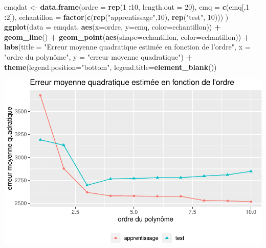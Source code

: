 \documentclass[
]{book}
\newenvironment{Shaded}{\begin{snugshade}}{\end{snugshade}}
\newcommand{\DataTypeTok}[1]{\textcolor[rgb]{0.13,0.29,0.53}{#1}}
\newcommand{\DecValTok}[1]{\textcolor[rgb]{0.00,0.00,0.81}{#1}}
\newcommand{\KeywordTok}[1]{\textcolor[rgb]{0.13,0.29,0.53}{\textbf{#1}}}
\newcommand{\NormalTok}[1]{#1}
\newcommand{\OperatorTok}[1]{\textcolor[rgb]{0.81,0.36,0.00}{\textbf{#1}}}
\newcommand{\StringTok}[1]{\textcolor[rgb]{0.31,0.60,0.02}{#1}}
\theoremstyle{definition}
\theoremstyle{definition}
\theoremstyle{definition}
\theoremstyle{remark}
\begin{document}
\begin{Shaded}
\begin{Highlighting}[]
\NormalTok{emqdat <-}\StringTok{ }\KeywordTok{data.frame}\NormalTok{(}\DataTypeTok{ordre =} \KeywordTok{rep}\NormalTok{(}\DecValTok{1} \OperatorTok{:}\DecValTok{10}\NormalTok{, }\DataTypeTok{length.out =} \DecValTok{20}\NormalTok{), }
           \DataTypeTok{emq =} \KeywordTok{c}\NormalTok{(emq[,}\DecValTok{1} \OperatorTok{:}\DecValTok{2}\NormalTok{]),}
           \DataTypeTok{echantillon =} \KeywordTok{factor}\NormalTok{(}\KeywordTok{c}\NormalTok{(}\KeywordTok{rep}\NormalTok{(}\StringTok{"apprentissage"}\NormalTok{,}\DecValTok{10}\NormalTok{), }\KeywordTok{rep}\NormalTok{(}\StringTok{"test"}\NormalTok{, }\DecValTok{10}\NormalTok{)))}
\NormalTok{)}
\KeywordTok{ggplot}\NormalTok{(}\DataTypeTok{data =}\NormalTok{ emqdat, }\KeywordTok{aes}\NormalTok{(}\DataTypeTok{x=}\NormalTok{ordre, }\DataTypeTok{y=}\NormalTok{emq, }\DataTypeTok{color=}\NormalTok{echantillon)) }\OperatorTok{+}
\StringTok{  }\KeywordTok{geom_line}\NormalTok{() }\OperatorTok{+}\StringTok{ }
\StringTok{  }\KeywordTok{geom_point}\NormalTok{(}\KeywordTok{aes}\NormalTok{(}\DataTypeTok{shape=}\NormalTok{echantillon, }\DataTypeTok{color=}\NormalTok{echantillon)) }\OperatorTok{+}\StringTok{ }
\StringTok{  }\KeywordTok{labs}\NormalTok{(}\DataTypeTok{title =} \StringTok{"Erreur moyenne quadratique estimée en fonction de l'ordre"}\NormalTok{, }
     \DataTypeTok{x =} \StringTok{"ordre du polynôme"}\NormalTok{, }
     \DataTypeTok{y =} \StringTok{"erreur moyenne quadratique"}\NormalTok{) }\OperatorTok{+}\StringTok{ }
\StringTok{  }\KeywordTok{theme}\NormalTok{(}\DataTypeTok{legend.position=}\StringTok{"bottom"}\NormalTok{,}
        \DataTypeTok{legend.title=}\KeywordTok{element_blank}\NormalTok{())}
\end{Highlighting}
\end{Shaded}

\begin{center}\includegraphics{MATH60602_files/figure-latex/02-plotEMQa-1} \end{center}
\end{document}
